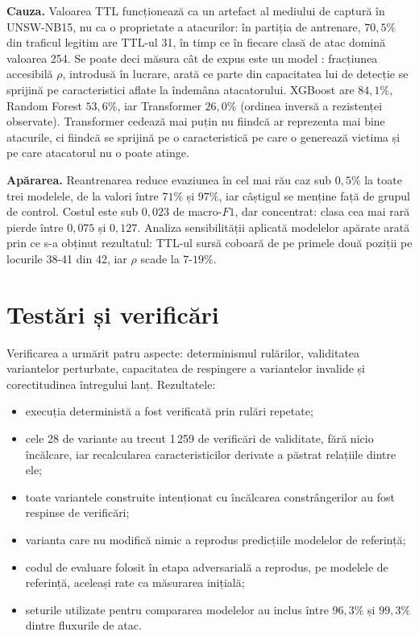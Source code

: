 \documentclass[11pt,a4paper]{article}
\begin{document}
\textbf{Cauza.} Valoarea TTL funcționează ca un artefact al mediului de captură în UNSW-NB15,
nu ca o proprietate a atacurilor: în partiția de antrenare, $70{,}5\%$ din traficul legitim
are TTL-ul 31, în timp ce în fiecare clasă de atac domină valoarea 254. Se poate
deci măsura cât de expus este un model : fracțiunea accesibilă $\rho$, introdusă în 
lucrare, arată ce parte din capacitatea lui de detecție se sprijină pe caracteristici aflate 
la îndemâna atacatorului. XGBoost are $84{,}1\%$, Random Forest $53{,}6\%$, iar Transformer $26{,}0\%$ (ordinea
inversă a rezistenței observate). Transformer cedează mai puțin nu fiindcă ar reprezenta mai
bine atacurile, ci fiindcă se sprijină pe o caracteristică pe care o generează victima și pe
care atacatorul nu o poate atinge.

\textbf{Apărarea.} Reantrenarea reduce evaziunea în cel mai rău caz sub $0{,}5\%$ la toate
trei modelele, de la valori între $71\%$ și $97\%$, iar câștigul se menține față de grupul de
control. Costul este sub $0{,}023$ de macro-$F1$, dar concentrat: clasa cea mai rară pierde
între $0{,}075$ și $0{,}127$. Analiza sensibilității aplicată modelelor apărate arată prin ce
s-a obținut rezultatul: TTL-ul sursă coboară de pe primele două poziții pe locurile 38-41 din
42, iar $\rho$ scade la $7$-$19\%$.

\section{Testări și verificări}

Verificarea a urmărit patru aspecte: determinismul rulărilor, validitatea variantelor
perturbate, capacitatea de respingere a variantelor invalide și corectitudinea întregului
lanț. Rezultatele:

\begin{itemize}
	\item execuția deterministă a fost verificată prin rulări repetate;
	\item cele 28 de variante au trecut 1\,259 de verificări de validitate, fără nicio
	încălcare, iar recalcularea caracteristicilor derivate a păstrat relațiile dintre ele;
	\item toate variantele construite intenționat cu încălcarea constrângerilor au fost
	respinse de verificări;
	\item varianta care nu modifică nimic a reprodus predicțiile modelelor de referință;
	\item codul de evaluare folosit în etapa adversarială a reprodus, pe modelele de
	referință, aceleași rate ca măsurarea inițială;
	\item seturile utilizate pentru compararea modelelor au inclus între $96{,}3\%$ și
	$99{,}3\%$ dintre fluxurile de atac.
\end{itemize}
\end{document}
